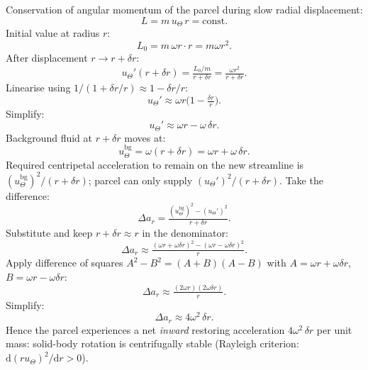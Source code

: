 \documentclass[11pt]{article}
\newcommand{\de}{\mathrm{d}}
\begin{document}
\begin{center}
\end{center}

Conservation of angular momentum of the parcel during slow radial displacement:
\[
L = m\,u_\Theta\,r = \text{const}.
\]
Initial value at radius $r$:
\[
L_0 = m\,\omega r\cdot r = m\omega r^2.
\]
After displacement $r\to r+\delta r$:
\[
u_\Theta'(r+\delta r) = \tfrac{L_0/m}{r+\delta r} = \tfrac{\omega r^2}{r+\delta r}.
\]
Linearise using $1/(1+\delta r/r)\approx 1-\delta r/r$:
\[
u_\Theta' \approx \omega r\bigl(1 - \tfrac{\delta r}{r}\bigr).
\]
Simplify:
\[
u_\Theta' \approx \omega r - \omega\,\delta r.
\]
Background fluid at $r+\delta r$ moves at:
\[
u_\Theta^\text{bg} = \omega(r+\delta r) = \omega r + \omega\,\delta r.
\]
Required centripetal acceleration to remain on the new streamline is $(u_\Theta^\text{bg})^2/(r+\delta r)$; parcel can only supply $(u_\Theta')^2/(r+\delta r)$. Take the difference:
\[
\Delta a_r = \tfrac{(u_\Theta^\text{bg})^2 - (u_\Theta')^2}{r+\delta r}.
\]
Substitute and keep $r+\delta r\approx r$ in the denominator:
\[
\Delta a_r \approx \tfrac{(\omega r+\omega\delta r)^2 - (\omega r - \omega\delta r)^2}{r}.
\]
Apply difference of squares $A^2-B^2 = (A+B)(A-B)$ with $A=\omega r+\omega\delta r$, $B=\omega r-\omega\delta r$:
\[
\Delta a_r \approx \tfrac{(2\omega r)(2\omega\delta r)}{r}.
\]
Simplify:
\[
\Delta a_r \approx 4\omega^2\,\delta r.
\]
Hence the parcel experiences a net \emph{inward} restoring acceleration $4\omega^2\,\delta r$ per unit mass: solid-body rotation is centrifugally stable (Rayleigh criterion: $\de(r u_\Theta)^2/\de r > 0$).
\end{document}
